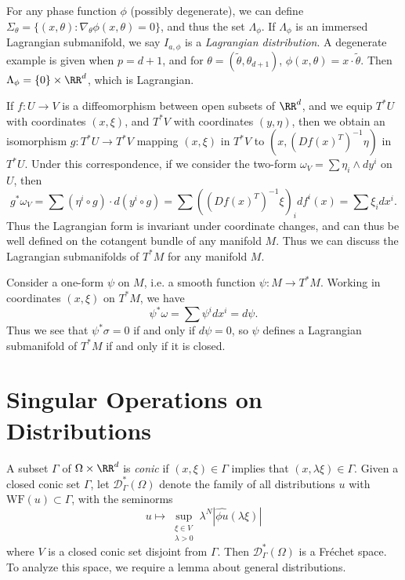 For any phase function $\phi$ (possibly degenerate), we can define $\Sigma_\theta = \{ (x,\theta): \nabla_\theta \phi(x,\theta) = 0 \}$, and thus the set $\Lambda_\phi$. If $\Lambda_\phi$ is an immersed Lagrangian submanifold, we say $I_{a,\phi}$ is a \emph{Lagrangian distribution}. A degenerate example is given when $p = d+1$, and for $\theta = (\tilde{\theta}, \theta_{d+1})$, $\phi(x,\theta) = x \cdot \tilde{\theta}$. Then $\Lambda_\phi = \{ 0 \} \times \RR^d$, which is Lagrangian.

If $f: U \to V$ is a diffeomorphism between open subsets of $\RR^d$, and we equip $T^* U$ with coordinates $(x,\xi)$, and $T^* V$ with coordinates $(y,\eta)$, then we obtain an isomorphism $g: T^* U \to T^* V$ mapping $(x,\xi)$ in $T^* V$ to $(x, (Df(x)^T)^{-1} \eta)$ in $T^* U$. Under this correspondence, if we consider the two-form $\omega_V = \sum \eta_i \wedge dy^i$ on $U$, then
%
\[ g^* \omega_V = \sum (\eta^i \circ g) \cdot d(y^i \circ g) = \sum ((Df(x)^T)^{-1} \xi)_i df^i(x) = \sum \xi_i dx^i. \]
%
Thus the Lagrangian form is invariant under coordinate changes, and can thus be well defined on the cotangent bundle of any manifold $M$. Thus we can discuss the Lagrangian submanifolds of $T^* M$ for any manifold $M$.

\begin{example}
    Consider a one-form $\psi$ on $M$, i.e. a smooth function $\psi: M \to T^* M$. Working in coordinates $(x,\xi)$ on $T^* M$, we have
    \[ \psi^* \omega = \sum \psi^i dx^i = d\psi. \]
    Thus we see that $\psi^* \sigma = 0$ if and only if $d\psi = 0$, so $\psi$ defines a Lagrangian submanifold of $T^* M$ if and only if it is closed.
\end{example}

\section{Singular Operations on Distributions}

A subset $\Gamma$ of $\Omega \times \RR^d$ is \emph{conic} if $(x,\xi) \in \Gamma$ implies that $(x,\lambda \xi) \in \Gamma$. Given a closed conic set $\Gamma$, let $\mathcal{D}^*_\Gamma(\Omega)$ denote the family of all distributions $u$ with $\text{WF}(u) \subset \Gamma$, with the seminorms
%
\[ u \mapsto \sup_{\substack{\xi \in V\\\lambda > 0}} \lambda^N |\widehat{\phi u}(\lambda \xi)| \]
%
where $V$ is a closed conic set disjoint from $\Gamma$. Then $\mathcal{D}^*_\Gamma(\Omega)$ is a Fr\'{e}chet space. To analyze this space, we require a lemma about general distributions.

